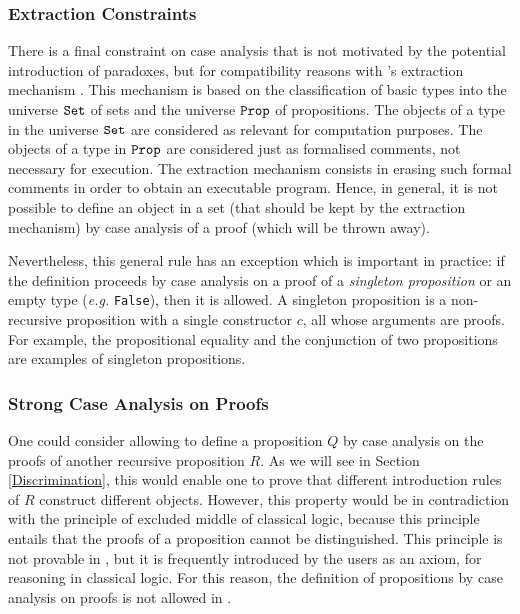 \documentclass[11pt]{article}
\newcommand{\refmancite}[1]{{}}
\begin{document}
\subsubsection{Extraction Constraints}

There is a final constraint on case analysis that is not motivated by
the potential introduction of paradoxes, but for compatibility reasons
with {\coq}'s extraction mechanism \refmancite{Appendix
\ref{CamlHaskellExtraction}}. This mechanism is based on the
classification of basic types into the universe $\texttt{Set}$ of sets and the
universe $\texttt{Prop}$ of propositions.  The objects of a type in the
universe $\texttt{Set}$ are considered as relevant for computation
purposes. The objects of a type in $\texttt{Prop}$ are considered just as
formalised comments, not necessary for execution. The extraction
mechanism consists in erasing such formal comments in order to obtain
an executable program. Hence, in general, it is not possible to define
an object in a set (that should be kept by the extraction mechanism)
by case analysis of a proof (which will be thrown away).

Nevertheless, this general rule has an exception which is important in
practice: if the definition proceeds by case analysis on a proof of a
\textsl{singleton proposition} or an empty type (\emph{e.g.} \texttt{False}),
 then it is allowed. A singleton
proposition is a non-recursive proposition with a single constructor
$c$, all whose arguments are proofs. For example, the propositional
equality and the conjunction of two propositions are examples of
singleton propositions.


\subsubsection{Strong Case Analysis on Proofs}

One could consider allowing 
 to define a proposition $Q$ by case
analysis on the proofs of another recursive proposition $R$. As we
will see in Section \ref{Discrimination}, this would enable one to prove that
different introduction rules of $R$ construct different
objects. However, this property would be in contradiction with the principle
of excluded middle of classical logic, because this principle entails
that the proofs of a proposition cannot be distinguished. This
principle is not provable in {\coq}, but it is frequently introduced by
the users as an axiom, for reasoning in classical logic. For this
reason, the definition of propositions by case analysis on proofs is
 not allowed in {\coq}.
\end{document}
